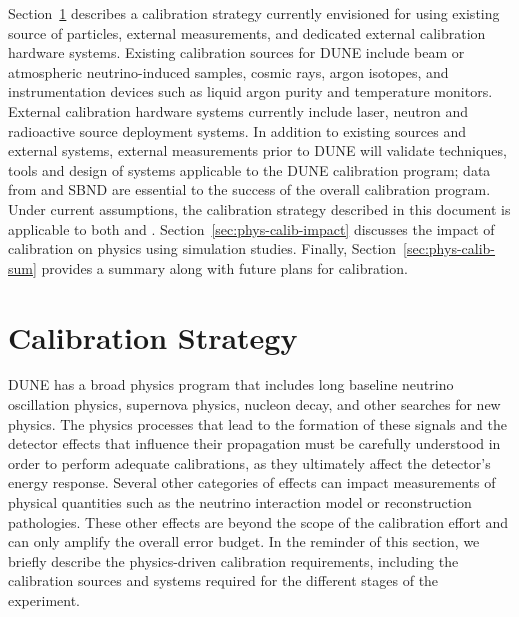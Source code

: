 Section~\ref{sec:phys-calibstrat} describes a calibration strategy currently envisioned for  using existing source of particles, external measurements, and dedicated external calibration hardware systems. Existing calibration sources for DUNE include beam or atmospheric neutrino-induced samples, cosmic rays, argon isotopes, and instrumentation devices such as liquid argon purity and temperature monitors. External calibration hardware systems currently include laser, neutron and radioactive source deployment systems. In addition to existing sources and external systems, external measurements prior to DUNE will validate techniques, tools and design of systems applicable to the DUNE calibration program; data from  and SBND are essential to the success of the overall calibration program. 
Under current assumptions, the calibration strategy described in this document is applicable to both  and . Section~\ref{sec:phys-calib-impact} discusses the impact of calibration on  physics using simulation studies.
Finally, Section~\ref{sec:phys-calib-sum} provides a summary along with future plans for calibration.

\section{Calibration Strategy}
\label{sec:phys-calibstrat} 

DUNE has a broad physics program that includes long baseline neutrino oscillation physics, supernova physics, nucleon decay, and other searches for new physics. The physics processes that lead to the formation of these signals and the detector effects that influence their propagation must be carefully understood in order to perform adequate calibrations, as they ultimately affect the detector's energy response. Several other categories of effects can impact measurements of physical quantities such as the neutrino interaction model or reconstruction pathologies. These other effects are beyond the scope of the  calibration effort and can only amplify the overall error budget. In the reminder of this section, we briefly describe the physics-driven calibration requirements, including the calibration sources and systems required for the different stages of the experiment.

